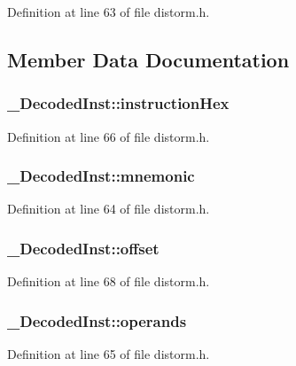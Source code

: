 Definition at line 63 of file distorm.h.

\subsection{Member Data Documentation}
\subsubsection[{instructionHex}]{ {\bf \_\-DecodedInst::instructionHex}}\label{struct__DecodedInst_d84500ddfd0f4039a9f97145bc395e3f}




Definition at line 66 of file distorm.h.
\subsubsection[{mnemonic}]{ {\bf \_\-DecodedInst::mnemonic}}\label{struct__DecodedInst_42296a0d0848dc8da63c0e1a60cdaae6}




Definition at line 64 of file distorm.h.
\subsubsection[{offset}]{ {\bf \_\-DecodedInst::offset}}\label{struct__DecodedInst_47f844e2770222483cefe9b0b069eba7}




Definition at line 68 of file distorm.h.
\subsubsection[{operands}]{ {\bf \_\-DecodedInst::operands}}\label{struct__DecodedInst_9d6267b4909e3718789d1af525808744}




Definition at line 65 of file distorm.h.
